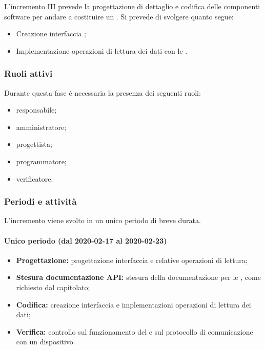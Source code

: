 			L'incremento III prevede la progettazione di dettaglio e codifica delle componenti software per andare a costituire un . Si prevede di svolgere quanto segue:
			\begin{itemize}
				\item Creazione interfaccia ;
				\item Implementazione operazioni di lettura dei dati con le .
			\end{itemize}
			
			\subsubsection{Ruoli attivi}
			
				Durante questa fase è necessaria la presenza dei seguenti ruoli:
				\begin{itemize}
					\item responsabile;
					\item amministratore;
					\item progettista;
					\item programmatore;
					\item verificatore.
				\end{itemize}
			
			\subsubsection{Periodi e attività}
			
				L'incremento viene svolto in un unico periodo di breve durata.
				
				\paragraph{Unico periodo (dal 2020-02-17 al 2020-02-23)}
				
					\begin{itemize}
						\item \textbf{Progettazione:} progettazione interfaccia  e relative operazioni di lettura;
						\item \textbf{Stesura documentazione API:} stesura della documentazione per le , come richiesto dal capitolato;
						\item \textbf{Codifica:} creazione interfaccia  e implementazioni operazioni di lettura dei dati;
						\item \textbf{Verifica:} controllo sul funzionamento del  e sul protocollo di comunicazione con un dispositivo.
					\end{itemize} 			

